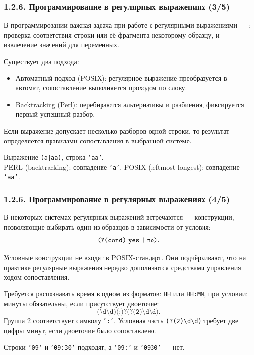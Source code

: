 \begin{frame}
\frametitle{1.2.6. Программирование в регулярных выражениях (3/5)}
В программировании важная задача при работе с регулярными выражениями ---
:
проверка соответствия строки или её фрагмента некоторому образцу,
и извлечение значений для переменных.

\smallskip
Существует два подхода:
\begin{itemize}
\item Автоматный подход (POSIX): регулярное выражение
преобразуется в автомат, сопоставление выполняется проходом по слову.

\item Backtracking (Perl): перебираются
альтернативы и разбиения, фиксируется первый успешный разбор.
\end{itemize}

\begin{remark}
Если выражение допускает несколько разборов одной строки, то результат
определяется правилами сопоставления в выбранной системе.
\end{remark}

\begin{example}
Выражение \texttt{(a|aa)}, строка \texttt{'aa'}.\\
PERL (backtracking): совпадение \texttt{'a'}.
POSIX (leftmost-longest): совпадение \texttt{'aa'}.
\end{example}
\end{frame}


\begin{frame}
\frametitle{1.2.6. Программирование в регулярных выражениях (4/5)}
В некоторых системах регулярных выражений встречаются
 ---
конструкции, позволяющие выбирать один из образцов в зависимости от условия:
\[
\texttt{(?(cond)\;yes\;|\;no)}.
\]

\begin{remark}
Условные конструкции не входят в POSIX-стандарт.
Они подчёркивают, что на практике регулярные выражения нередко дополняются
средствами управления ходом сопоставления.
\end{remark}

\begin{example}
Требуется распознавать время в одном из форматов: \texttt{HH} или \texttt{HH:MM},
при условии: минуты обязательны, если присутствует двоеточие:
\[
\texttt{(\textbackslash d\textbackslash d)(:)?(?(2)\textbackslash d\textbackslash d)}.
\]
Группа 2 соответствует символу \texttt{':'}.
Условная часть \texttt{(?(2)\textbackslash d\textbackslash d)} требует две цифры минут, если двоеточие было сопоставлено.

\smallskip
Строки \texttt{'09'} и \texttt{'09:30'} подходят, а \texttt{'09:'} и \texttt{'0930'} --- нет.
\end{example}
\end{frame}


